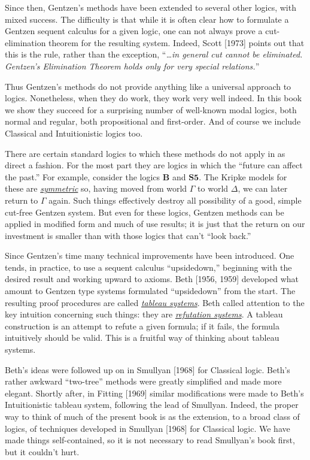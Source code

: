 Since then, 
Gentzen's methods have been extended to several other logics, with mixed success.
% 
The difficulty is that while it is often clear how to formulate a Gentzen sequent calculus for a given logic, 
one can not always prove a cut-elimination theorem for the resulting system.
% 
Indeed, 
Scott [1973] points out that this is the rule,
rather than the exception, 
``\textit{\dots in general cut cannot be eliminated. 
Gentzen's Elimination Theorem holds only for very special relations.}''


Thus Gentzen's methods do not provide anything like a universal approach to logics.
% 
Nonetheless, 
when they do work, they work very well indeed.
% 
In this book we show they succeed for a surprising number of well-known modal logics, 
both normal and regular, 
both propositional and first-order.
% 
And of course we include Classical and Intuitionistic logics too.



There are certain standard logics to which these methods do not apply in as direct a fashion. 
% 
% 
For the most part they are logics in which the ``future can affect the
past.''
% 
For example, 
consider the logics $\mathbf{B}$ and $\mathbf{S5}$.
% 
The Kripke models for these are \underline{\textit{symmetric}} so, having moved from world $\Gamma$ to world $\Delta$, 
we can later return to $\Gamma$ again.
% 
% 
Such things effectively destroy all possibility of a good,
simple cut-free Gentzen system.
% 
But even for these logics,
Gentzen methods can be applied in modified form and much of use results; 
it is just that the return on our investment is smaller than with those logics that can't ``look back.''




Since Gentzen's time many technical improvements have been introduced.
% 
One tends, in practice, to use a sequent calculus ``upsidedown,'' beginning with the desired result and working upward to axioms.
% 
Beth [1956, 1959] developed
what amount to Gentzen type systems formulated ``upsidedown'' from the start.
% 
The resulting proof procedures are called \underline{\textit{tableau systems}}.
% 
Beth called attention to the key intuition concerning such things: 
they are \underline{\textit{refutation systems}}.
% 
A tableau construction is an attempt to refute a given formula; 
if it fails, the formula intuitively should be valid.
% 
This is a fruitful way of thinking about tableau systems.


Beth's ideas were followed up on in Smullyan [1968] for Classical logic.
% 
Beth's rather awkward ``two-tree'' methods were greatly simplified and made more elegant.
% 
Shortly after, 
in Fitting [1969] similar modifications were made to Beth's Intuitionistic tableau system, 
following the lead of Smullyan.
% 
Indeed, the proper way to think of much of the present book is as the extension, 
to a broad class of logics, 
of techniques developed in Smullyan [1968] for Classical logic.
% 
We have made things self-contained, 
so it is not necessary to read Smullyan's book first, 
but it couldn't hurt.


